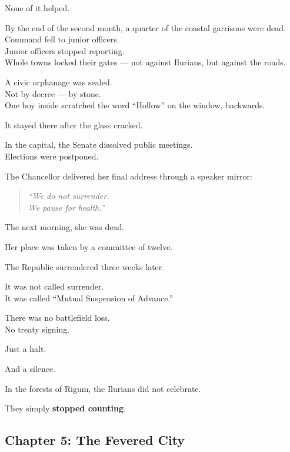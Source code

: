 \documentclass[9pt]{article}
\begin{document}
None of it helped.

\vspace{1em}

By the end of the second month, a quarter of the coastal garrisons were dead.\\
Command fell to junior officers.\\
Junior officers stopped reporting.\\
Whole towns locked their gates — not against Ilurians, but against the roads.

A civic orphanage was sealed.\\
Not by decree — by stone.\\
One boy inside scratched the word “Hollow” on the window, backwards.

It stayed there after the glass cracked.

\vspace{1em}

In the capital, the Senate dissolved public meetings.\\
Elections were postponed.

The Chancellor delivered her final address through a speaker mirror:

\begin{quote}
\textit{“We do not surrender.}\\
\textit{We pause for health.”}
\end{quote}

The next morning, she was dead.

Her place was taken by a committee of twelve.

\vspace{1em}

The Republic surrendered three weeks later.

It was not called surrender.\\
It was called “Mutual Suspension of Advance.”

There was no battlefield loss.\\
No treaty signing.

Just a halt.

And a silence.

\vspace{1em}

In the forests of Rigum, the Ilurians did not celebrate.

They simply \textbf{stopped counting}.

\newpage

\subsection*{Chapter 5: The Fevered City}
\end{document}

